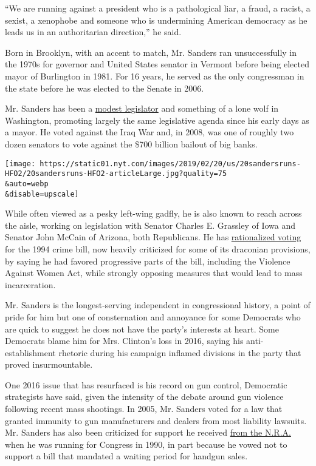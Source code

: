 ``We are running against a president who is a pathological liar, a
fraud, a racist, a sexist, a xenophobe and someone who is undermining
American democracy as he leads us in an authoritarian direction,'' he
said.

Born in Brooklyn, with an accent to match, Mr. Sanders ran
unsuccessfully in the 1970s for governor and United States senator in
Vermont before being elected mayor of Burlington in 1981. For 16 years,
he served as the only congressman in the state before he was elected to
the Senate in 2006.

Mr. Sanders has been a
\href{https://www.nytimes.com/2016/03/15/us/politics/bernie-sanders-amendments.html}{modest
legislator} and something of a lone wolf in Washington, promoting
largely the same legislative agenda since his early days as a mayor. He
voted against the Iraq War and, in 2008, was one of roughly two dozen
senators to vote against the \$700 billion bailout of big banks.

\texttt{[image: https://static01.nyt.com/images/2019/02/20/us/20sandersruns-HFO2/20sandersruns-HFO2-articleLarge.jpg?quality=75\\\&auto=webp\\\&disable=upscale]}

While often viewed as a pesky left-wing gadfly, he is also known to
reach across the aisle, working on legislation with Senator Charles E.
Grassley of Iowa and Senator John McCain of Arizona, both Republicans.
He has
\href{https://www.washingtonpost.com/news/post-politics/wp/2016/02/12/1994-crime-bill-haunts-clinton-and-sanders-as-criminal-justice-reform-rises-to-top-in-democratic-contest/?utm_term=.93a0a5d9f1ce}{rationalized
voting} for the 1994 crime bill, now heavily criticized for some of its
draconian provisions, by saying he had favored progressive parts of the
bill, including the Violence Against Women Act, while strongly opposing
measures that would lead to mass incarceration.

Mr. Sanders is the longest-serving independent in congressional history,
a point of pride for him but one of consternation and annoyance for some
Democrats who are quick to suggest he does not have the party's
interests at heart. Some Democrats blame him for Mrs. Clinton's loss in
2016, saying his anti-establishment rhetoric during his campaign
inflamed divisions in the party that proved insurmountable.

One 2016 issue that has resurfaced is his record on gun control,
Democratic strategists have said, given the intensity of the debate
around gun violence following recent mass shootings. In 2005, Mr.
Sanders voted for a law that granted immunity to gun manufacturers and
dealers from most liability lawsuits. Mr. Sanders has also been
criticized for support he received
\href{https://www.washingtonpost.com/politics/how-the-nra-helped-put-bernie-sanders-in-congress/2015/07/19/ed1be26c-2bfe-11e5-bd33-395c05608059_story.html?utm_term=.36a779048ad8}{from
the N.R.A.} when he was running for Congress in 1990, in part because he
vowed not to support a bill that mandated a waiting period for handgun
sales.

